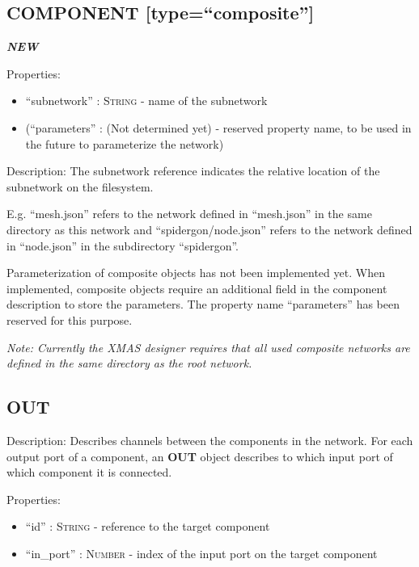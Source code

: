\subsection{COMPONENT
{[}type=``composite''{]}}\label{component-typecomposite}

\textbf{\emph{NEW}}

Properties:

\begin{itemize}
\itemsep1pt\parskip0pt
\item
  ``subnetwork'' : \textsc{String} - name of the subnetwork
\item
  (``parameters'' : (Not determined yet) - reserved property
  name, to be used in the future to parameterize the network)
\end{itemize}

Description: The subnetwork reference indicates the relative location of
the subnetwork on the filesystem.

E.g. ``mesh.json'' refers to the network defined in ``mesh.json'' in the
same directory as this network and ``spidergon/node.json'' refers to the
network defined in ``node.json'' in the subdirectory ``spidergon''.

Parameterization of composite objects has not been implemented yet. When
implemented, composite objects require an additional field in the
component description to store the parameters. The property name
``parameters'' has been reserved for this purpose.

\emph{Note: Currently the XMAS designer requires that all used composite
networks are defined in the same directory as the root network.}

\subsection{OUT}\label{out}

Description: Describes channels between the components in the network.
For each output port of a component, an \textbf{OUT} object describes to
which input port of which component it is connected.

Properties:

\begin{itemize}
\itemsep1pt\parskip0pt
\item
  ``id'' : \textsc{String} - reference to the target component
\item
  ``in\_port'' : \textsc{Number} - index of the input port on the target
  component
\end{itemize}

